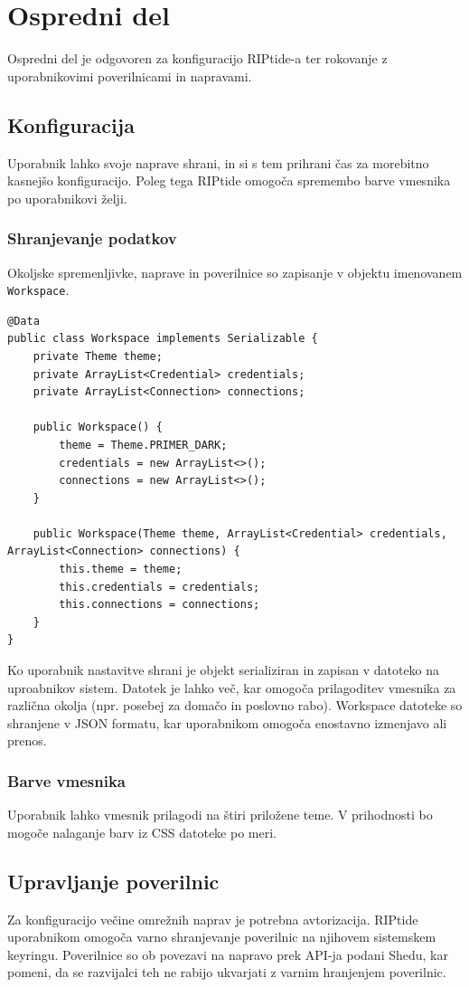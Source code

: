 \documentclass[12pt]{article}
\begin{document}
\section{Ospredni del}
Ospredni del je odgovoren za konfiguracijo RIPtide-a ter rokovanje z 
uporabnikovimi poverilnicami in napravami.

\subsection{Konfiguracija}
Uporabnik lahko svoje naprave shrani, in si s tem prihrani čas za
morebitno kasnejšo konfiguracijo. Poleg tega RIPtide omogoča spremembo
barve vmesnika po uporabnikovi želji.

\subsubsection{Shranjevanje podatkov}
Okoljske spremenljivke, naprave in poverilnice so zapisanje v objektu
imenovanem \texttt{Workspace}.

\begin{lstlisting}[style=JavaStyle]
@Data
public class Workspace implements Serializable {
	private Theme theme;
	private ArrayList<Credential> credentials;
	private ArrayList<Connection> connections;

	public Workspace() {
		theme = Theme.PRIMER_DARK;
		credentials = new ArrayList<>();
		connections = new ArrayList<>();
	}

	public Workspace(Theme theme, ArrayList<Credential> credentials, ArrayList<Connection> connections) {
		this.theme = theme;
		this.credentials = credentials;
		this.connections = connections;
	}
}
\end{lstlisting}
Ko uporabnik nastavitve shrani je objekt serializiran in zapisan v datoteko
na uproabnikov sistem. Datotek je lahko več, kar omogoča prilagoditev
vmesnika za različna okolja (npr. posebej za domačo in poslovno rabo).
Workspace datoteke so shranjene v JSON formatu, kar uporabnikom omogoča
enostavno izmenjavo ali prenos.

\subsubsection{Barve vmesnika}
Uporabnik lahko vmesnik prilagodi na štiri priložene teme. V prihodnosti
bo mogoče nalaganje barv iz CSS datoteke po meri.

\subsection{Upravljanje poverilnic}
Za konfiguracijo večine omrežnih naprav je potrebna avtorizacija.
RIPtide uporabnikom omogoča varno shranjevanje poverilnic na njihovem
sistemskem keyringu. Poverilnice so ob povezavi na napravo prek API-ja
podani Shedu, kar pomeni, da se razvijalci teh ne rabijo ukvarjati z
varnim hranjenjem poverilnic.
\end{document}
